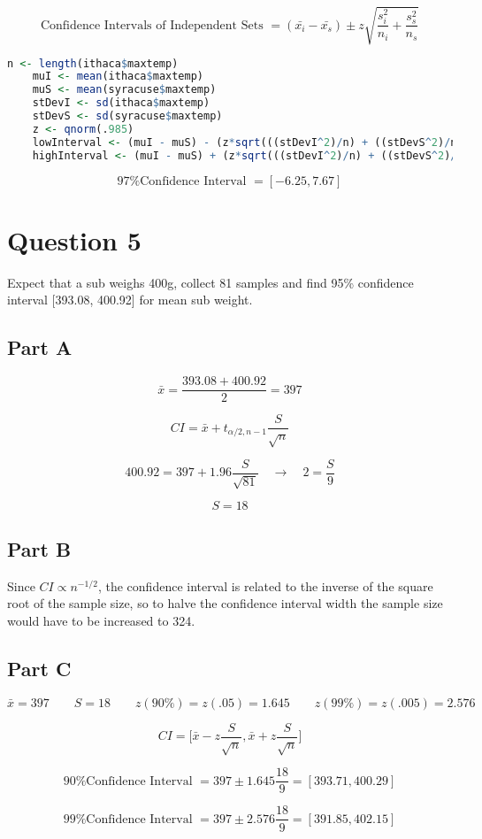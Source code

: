 \documentclass[letterpaper]{article}
\begin{document}
$$\text{Confidence Intervals of Independent Sets } = (\bar{x_i} - \bar{x_s}) \pm z \sqrt{\frac{s_i^2}{n_i} + \frac{s_s^2}{n_s}}$$

\begin{lstlisting}[language=R]
    n <- length(ithaca$maxtemp)
    muI <- mean(ithaca$maxtemp)
    muS <- mean(syracuse$maxtemp)
    stDevI <- sd(ithaca$maxtemp)
    stDevS <- sd(syracuse$maxtemp)
    z <- qnorm(.985)
    lowInterval <- (muI - muS) - (z*sqrt(((stDevI^2)/n) + ((stDevS^2)/n)))
    highInterval <- (muI - muS) + (z*sqrt(((stDevI^2)/n) + ((stDevS^2)/n)))
\end{lstlisting}

$$\text{97\% Confidence Interval } = [-6.25, 7.67]$$

\newpage

\section*{Question 5}

Expect that a sub weighs 400g, collect 81 samples and find 95\% confidence interval [393.08, 400.92] for mean sub weight.

\subsection*{Part A}

$$\bar{x} = \frac{393.08 + 400.92}{2} = 397$$

$$CI = \bar{x} + t_{\alpha/2, n-1} \frac{S}{\sqrt{n}}$$

$$400.92 = 397 + 1.96 \frac{S}{\sqrt{81}} \quad \longrightarrow \quad 2 = \frac{S}{9}$$

$$S = 18$$

\subsection*{Part B}

Since $CI \propto n^{-1/2}$, the confidence interval is related to the inverse of the square root of the sample size, so to halve the confidence interval width the sample size would have to be increased to 324.

\subsection*{Part C}

$$\bar{x} = 397 \qquad S = 18 \qquad z(90\%) = z(.05) = 1.645 \qquad z(99\%) = z(.005) = 2.576$$

$$CI = \Big[ \bar{x} - z \frac{S}{\sqrt{n}}, \bar{x} + z \frac{S}{\sqrt{n}}\Big]$$

$$\text{90\% Confidence Interval } = 397 \pm 1.645 \frac{18}{9} = [393.71, 400.29]$$

$$\text{99\% Confidence Interval } = 397 \pm 2.576 \frac{18}{9} = [391.85, 402.15]$$
\end{document}
